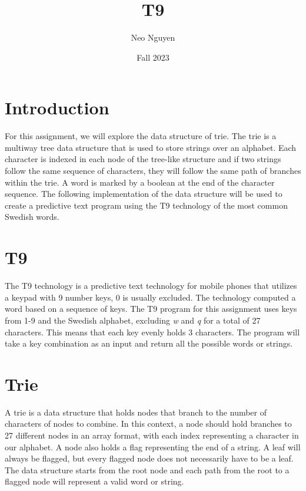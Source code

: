 \documentclass[a4paper,11pt]{article}
\begin{document}
\title{
    \textbf{T9}
}
\author{Neo Nguyen}
\date{Fall 2023}

\maketitle

\section*{Introduction}

    For this assignment, we will explore the data structure of trie. The trie is a multiway tree data structure that is used to store strings over an alphabet. Each character is indexed in each node of the tree-like structure and if two strings follow the same sequence of characters, they will follow the same path of branches within the trie. A word is marked by a boolean at the end of the character sequence. The following implementation of the data structure will be used to create a predictive text program using the T9 technology of the most common Swedish words.
    
\section*{T9}

   The T9 technology is a predictive text technology for mobile phones that utilizes a keypad with 9 number keys, 0 is usually excluded. The technology computed a word based on a sequence of keys. The T9 program for this assignment uses keys from 1-9 and the Swedish alphabet, excluding \textit{w} and \textit{q} for a total of 27 characters. This means that each key evenly holds 3 characters. The program will take a key combination as an input and return all the possible words or strings.

\section*{Trie}

    A trie is a data structure that holds nodes that branch to the number of characters of nodes to combine. In this context, a node should hold branches to 27 different nodes in an array format, with each index representing a character in our alphabet. A node also holds a flag representing the end of a string. A leaf will always be flagged, but every flagged node does not necessarily have to be a leaf. The data structure starts from the root node and each path from the root to a flagged node will represent a valid word or string. 
\end{document}
